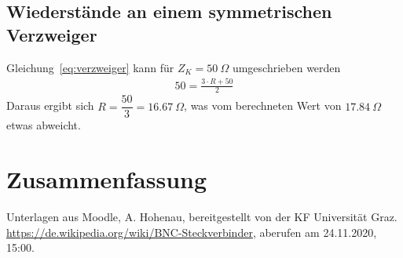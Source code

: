 \documentclass{article}
\begin{document}
\subsection{Wiederstände an einem symmetrischen Verzweiger}

Gleichung~\eqref{eq:verzweiger} kann für $Z_K = 50~\Omega$ umgeschrieben werden
\begin{align*}
50 = \frac{3\cdot R + 50}{2}
\end{align*}
Daraus ergibt sich $R = \dfrac{50}{3} = 16.67~\Omega$, was vom berechneten Wert von $17.84~\Omega$ etwas abweicht.


\section{Zusammenfassung}








%

%


%


\begin{thebibliography}{9}
 Unterlagen aus Moodle, A. Hohenau, bereitgestellt von der KF Universität Graz.
 \url{https://de.wikipedia.org/wiki/BNC-Steckverbinder}, aberufen am 24.11.2020, 15:00.
\end{thebibliography}
\end{document}
